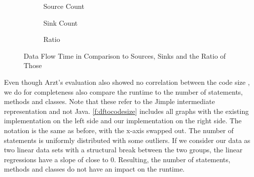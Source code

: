 \documentclass[../draft.tex]{subfiles}
\begin{document}
    \begin{figure}[tbp]
        \centering
        \begin{subfigure}[b]{0.45\textwidth}
            \centering
            \begin{subfigure}[]{\textwidth}
                \centering
                \resizebox{\columnwidth}{!}{
                    
                }
            \end{subfigure}
            \caption{Source Count}
            \label{f:dfsources}
        \end{subfigure}
        \qquad
        \begin{subfigure}[b]{0.45\textwidth}
            \centering
            \begin{subfigure}[]{\textwidth}
                \centering
                \resizebox{\columnwidth}{!}{
                    
                }
            \end{subfigure}
            \caption{Sink Count}
            \label{f:dfsinks}
        \end{subfigure}
        \bigbreak
        \begin{subfigure}[b]{\textwidth}
            \centering
            \begin{subfigure}[]{0.45\textwidth}
                \centering
                \resizebox{\columnwidth}{!}{
                    
                }
            \end{subfigure}
            \qquad
            \begin{subfigure}[]{0.45\textwidth}
                \centering
                \resizebox{\columnwidth}{!}{
                    
                }
            \end{subfigure}
            \caption{Ratio}
            \label{f:dfratio}
        \end{subfigure}
        \caption{Data Flow Time in Comparison to Sources, Sinks and the Ratio of Those}
        \label{f:dftoss}
    \end{figure}

    Even though Arzt's evaluation also showed no correlation between the code size \cite{Arzt2017PhD}, we do for completeness also compare the runtime to the number of statements, methods and classes.
    Note that these refer to the Jimple intermediate representation and not Java.
    \autoref{f:dftocodesize} includes all graphs with the existing implementation on the left side and our implementation on the right side.
    The notation is the same as before, with the x-axis swapped out.
    The number of statements is uniformly distributed with some outliers.
    If we consider our data as two linear data sets with a structural break between the two groups, the linear regressions have a slope of close to 0.
    Resulting, the number of statements, methods and classes do not have an impact on the runtime.
\end{document}
